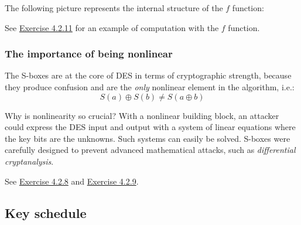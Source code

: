 \documentclass{article}
\begin{document}
  The following picture represents the internal structure of the $f$
  function:

  \begin{center}
  \end{center}

  See \hyperlink{ex4211}{Exercise 4.2.11} for an example of
  computation with the $f$ function.

  \subsubsection{The importance of being nonlinear}

  The S-boxes are at the core of DES in terms of cryptographic
  strength, because they produce confusion and are the \emph{only} 
  nonlinear element in the algorithm, i.e.:
  $$
	S(a) \oplus S(b) \neq S(a \oplus b)
  $$

  Why is nonlinearity so crucial? With a nonlinear building block, an
  attacker could express the DES input and output with a system of
  linear equations where the key bits are the unknowns. Such systems
  can easily be solved. S-boxes were carefully designed to
  prevent advanced mathematical attacks, such as \emph{differential
  cryptanalysis}.
  
  See \hyperlink{ex428}{Exercise 4.2.8} and \hyperlink{ex429}{Exercise
  4.2.9}.
  
  \subsection{Key schedule}
\end{document}
